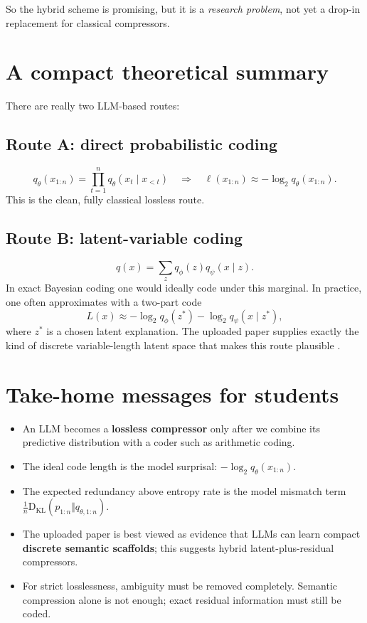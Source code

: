 \documentclass[11pt]{article}
\theoremstyle{remark}
\newcommand{\KL}{\mathrm{D_{KL}}}
\begin{document}
So the hybrid scheme is promising, but it is a \emph{research problem}, not yet a drop-in replacement for classical compressors.

\section{A compact theoretical summary}

There are really two LLM-based routes:

\subsection*{Route A: direct probabilistic coding}
\[
q_\theta(x_{1:n}) = \prod_{t=1}^n q_\theta(x_t\mid x_{<t})
\quad \Longrightarrow \quad
\ell(x_{1:n}) \approx -\log_2 q_\theta(x_{1:n}).
\]
This is the clean, fully classical lossless route.

\subsection*{Route B: latent-variable coding}
\[
q(x) = \sum_z q_\phi(z)q_\psi(x\mid z).
\]
In exact Bayesian coding one would ideally code under this marginal. In practice, one often approximates with a two-part code
\[
L(x) \approx -\log_2 q_\phi(z^*) - \log_2 q_\psi(x\mid z^*),
\]
where $z^*$ is a chosen latent explanation. The uploaded paper supplies exactly the kind of discrete variable-length latent space that makes this route plausible \cite{li2026}.

\section{Take-home messages for students}

\begin{itemize}
    \item An LLM becomes a \textbf{lossless compressor} only after we combine its predictive distribution with a coder such as arithmetic coding.
    \item The ideal code length is the model surprisal: $-\log_2 q_\theta(x_{1:n})$.
    \item The expected redundancy above entropy rate is the model mismatch term $\frac{1}{n}\KL(p_{1:n}\Vert q_{\theta,1:n})$.
    \item The uploaded paper is best viewed as evidence that LLMs can learn compact \textbf{discrete semantic scaffolds}; this suggests hybrid latent-plus-residual compressors.
    \item For strict losslessness, ambiguity must be removed completely. Semantic compression alone is not enough; exact residual information must still be coded.
\end{itemize}
\end{document}
